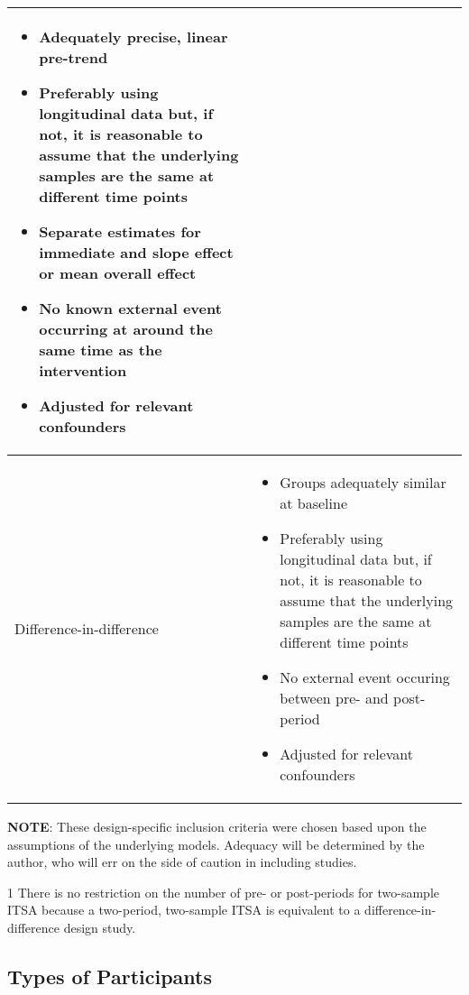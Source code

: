 \documentclass[12pt]{article}
\begin{document}
\begin{table}
\begin{center}
\begin{threeparttable}
\begin{tabularx}{\textwidth}{|p{3cm}|X|}
\begin{itemize}[noitemsep,topsep=0pt]
          \item Adequately precise, linear pre-trend
          \item Preferably using longitudinal data but, if not, it is reasonable to assume that the underlying samples are the same at different time points
          \item Separate estimates for immediate and slope effect or mean overall effect
          \item No known external event occurring at around the same time as the intervention
          \item Adjusted for relevant confounders
        \end{itemize}
          \\ \hline
        Difference-in-difference\tnote{1} &
        \begin{itemize}[noitemsep,topsep=0pt]
          \item Groups adequately similar at baseline
          \item Preferably using longitudinal data but, if not, it is reasonable to assume that the underlying samples are the same at different time points
          \item No external event occuring between pre- and post-period
          \item Adjusted for relevant confounders
        \end{itemize}
        \\ \hline
      \end{tabularx}
      \begin{tablenotes}
        \footnotesize
        \textbf{NOTE}: These design-specific inclusion criteria were chosen based upon the assumptions of the underlying models. Adequacy will be determined by the author, who will err on the side of caution in including studies.
        \item[1] There is no restriction on the number of pre- or post-periods for two-sample ITSA because a two-period, two-sample ITSA is equivalent to a difference-in-difference design study.
      \end{tablenotes}
    \end{threeparttable}
  \end{center}
\label{tab:DesignInclusionCriteria}
\end{table}


\subsection{Types of Participants}
\end{document}

